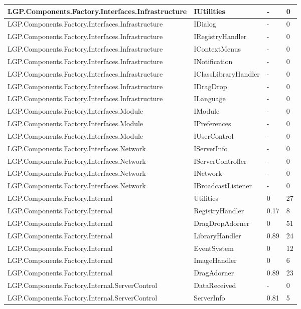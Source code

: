 \begin{table}[h!t]
{\begin{tabular}{ | p{85mm} | p{35mm} | p{13mm} | p{14mm}  | }
				LGP.Components.Factory.Interfaces.Infrastructure & IUtilities & -     & 0  \\ \hline
				LGP.Components.Factory.Interfaces.Infrastructure & IDialog & -     & 0  \\ \hline
				LGP.Components.Factory.Interfaces.Infrastructure & IRegistryHandler & -     & 0  \\ \hline
				LGP.Components.Factory.Interfaces.Infrastructure & IContextMenus & -     & 0  \\ \hline
				LGP.Components.Factory.Interfaces.Infrastructure & INotification & -     & 0  \\ \hline
				LGP.Components.Factory.Interfaces.Infrastructure & IClassLibraryHandler & -     & 0  \\ \hline
				LGP.Components.Factory.Interfaces.Infrastructure & IDragDrop & -     & 0  \\ \hline
				LGP.Components.Factory.Interfaces.Infrastructure & ILanguage & -     & 0  \\ \hline
				LGP.Components.Factory.Interfaces.Module & IModule & -     & 0  \\ \hline
				LGP.Components.Factory.Interfaces.Module & IPreferences & -     & 0  \\ \hline
				LGP.Components.Factory.Interfaces.Module & IUserControl & -     & 0  \\ \hline
				LGP.Components.Factory.Interfaces.Network & IServerInfo & -     & 0  \\ \hline
				LGP.Components.Factory.Interfaces.Network & IServerController & -     & 0  \\ \hline
				LGP.Components.Factory.Interfaces.Network & INetwork & -     & 0  \\ \hline
				LGP.Components.Factory.Interfaces.Network & IBroadcastListener & -     & 0  \\ \hline
				LGP.Components.Factory.Internal & Utilities & 0     & 27  \\ \hline
				LGP.Components.Factory.Internal & RegistryHandler & 0.17  & 8  \\ \hline
				LGP.Components.Factory.Internal & DragDropAdorner & 0     & 51  \\ \hline
				LGP.Components.Factory.Internal & LibraryHandler & \cellcolor{ored}0.89  & 24  \\ \hline
				LGP.Components.Factory.Internal & EventSystem & 0     & 12  \\ \hline
				LGP.Components.Factory.Internal & ImageHandler & 0     & 6  \\ \hline
				LGP.Components.Factory.Internal & DragAdorner & \cellcolor{ored}0.89  & 23  \\ \hline
				LGP.Components.Factory.Internal.ServerControl & DataReceived & -     & 0  \\ \hline
				LGP.Components.Factory.Internal.ServerControl & ServerInfo & 0.81  & 5 \\ \hline
				\end{tabular}}
				

\end{table}
